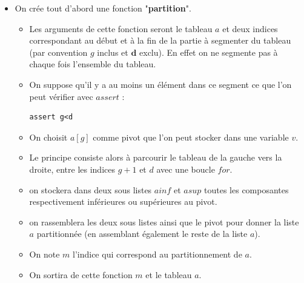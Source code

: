 \begin{itemize}
\item On crée tout d'abord une fonction "\textbf{partition}". 
\begin{itemize}
\item Les arguments de cette fonction seront le tableau \textbf{$a$} et deux indices correspondant au début et à la fin de la partie à segmenter du tableau (par convention \textbf{$g$} inclus et $\textbf{d}$ exclu). En effet on ne segmente pas à chaque fois l'ensemble du tableau.
\item On suppose qu'il y a au moins un élément dans ce segment ce que l'on peut vérifier avec \textbf{$assert$} : 


	\begin{DDbox}{\linewidth}
		\begin{verbatim}
assert g<d
		\end{verbatim}
	\end{DDbox}
\item On choisit \textbf{$a[g]$} comme pivot que l'on peut stocker dans une variable $v$.
\item Le principe consiste alors à parcourir le tableau de la gauche vers la droite, entre les indices \textbf{$g+1$} et \textbf{$d$} avec une boucle \textbf{$for$}.
\item on stockera dans deux sous listes \textbf{$ainf$} et \textbf{$asup$} toutes les composantes respectivement inférieures ou supérieures au pivot.
\item on rassemblera les deux sous listes ainsi que le pivot pour donner la liste \textbf{$a$} partitionnée (en assemblant également le reste de la liste $a$).
\item On note $m$ l'indice qui correspond au partitionnement de $a$.
\item On sortira de cette fonction $m$ et le tableau $a$.
\end{itemize}
\end{itemize}


